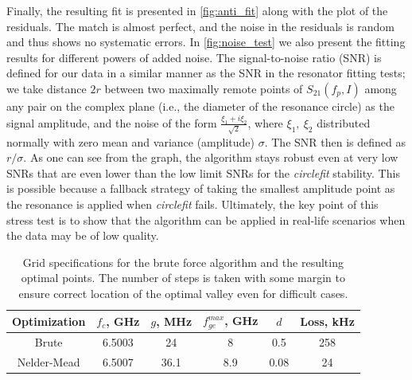 \documentclass[%
 aip,
 amsmath,amssymb,
 reprint,%
]{revtex4-1}
\begin{document}
Finally, the resulting fit is presented in \autoref{fig:anti_fit} along with the plot of the residuals. The match is almost perfect, and the noise in the residuals is random and thus shows no systematic errors. In \autoref{fig:noise_test} we also present the fitting results for different powers of added noise. The signal-to-noise ratio (SNR) is defined for our data in a similar manner as the SNR in the resonator fitting tests\cite{probst2015}; we take distance $2r$ between two maximally remote points of $S_{21}(f_p, I)$ among any pair on the complex plane (i.e., the diameter of the resonance circle) as the signal amplitude, and the noise of the form $\frac{\xi_1+i\xi_2}{\sqrt 2}$, where $\xi_1,\ \xi_2$ distributed normally with zero mean and variance (amplitude) $\sigma$. The SNR then is defined as $r/\sigma$. As one can see from the graph, the algorithm stays robust even at very low SNRs that are even lower than the low limit SNRs for the \textit{circlefit} stability. This is possible because a fallback strategy of taking the smallest amplitude point as the resonance is applied when \textit{circlefit} fails. Ultimately, the key point of this stress test is to show that the algorithm can be applied in real-life scenarios when the data may be of low quality.
\begin{table}
	\centering
	\begin{ruledtabular}
		\begin{tabular}{cccccc} 
			Optimization & $f_c$, GHz  & $g$, MHz & $f_{ge}^{max}$, GHz & 	$d$ & Loss, kHz \\ 
			\hline
			Brute &6.5003 & 24 & 8 & 0.5 &  258   \\
			Nelder-Mead & 6.5007 & 36.1 &  8.9 & 0.08 &   24 \\
		\end{tabular} 
	\end{ruledtabular}
	\caption{Grid specifications for the brute force algorithm and the resulting optimal points. The number of steps is taken with some margin to ensure correct location of the optimal valley even for difficult cases. }
	\label{tab:sts_results}
\end{table}
\end{document}
